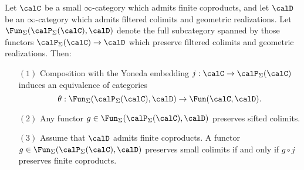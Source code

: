 \begin{proposition}\label{surottt}
Let $\calC$ be a small $\infty$-category which admits finite coproducts, and let
$\calD$ be an $\infty$-category which admits filtered colimits and geometric realizations.
Let $\Fun_{\Sigma}( \calP_{\Sigma}(\calC), \calD)$ denote the full subcategory spanned by those functors $\calP_{\Sigma}(\calC) \rightarrow \calD$ which preserve filtered colimits and geometric realizations. Then:
\begin{itemize}
\item[$(1)$] Composition with the Yoneda embedding $j: \calC \rightarrow \calP_{\Sigma}(\calC)$ induces an equivalence of categories
$$ \theta: \Fun_{\Sigma}( \calP_{\Sigma}(\calC), \calD) \rightarrow \Fun(\calC, \calD).$$

\item[$(2)$] Any functor $g \in \Fun_{\Sigma}( \calP_{\Sigma}(\calC), \calD)$ preserves sifted colimits.

\item[$(3)$] Assume that $\calD$ admits finite coproducts. A functor $g \in \Fun_{\Sigma}( \calP_{\Sigma}(\calC), \calD)$ preserves small colimits if and only if $g \circ j$ preserves finite coproducts.
\end{itemize}
\end{proposition}

